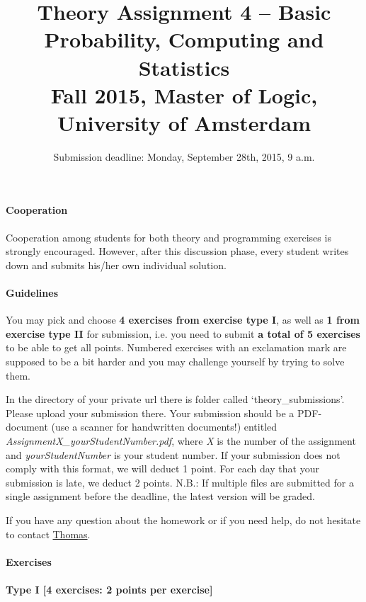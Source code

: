 \documentclass{article}
\title{Theory Assignment 4 -- Basic Probability, Computing and Statistics\\[2mm]
\large{Fall 2015, Master of Logic, University of Amsterdam}}
\author{}
\date{Submission deadline: Monday, September 28th, 2015, 9 a.m.}
\begin{document}
\maketitle

\paragraph{Cooperation}
Cooperation among students for both theory and programming exercises
is strongly encouraged.  However, after this discussion phase, every student writes down and submits his/her own individual solution.

\paragraph{Guidelines}
You may pick and choose {\bf 4 exercises from exercise type I}, as well as {\bf 1 from exercise type II} for submission, i.e. you need to submit {\bf a total of 5 exercises} to be able to get all points. Numbered exercises with an exclamation mark are supposed to be a bit harder and you may challenge yourself by trying to solve them.

In the directory of your private url there is folder called `theory\_submissions'. Please upload your submission there. Your submission should be a PDF-document (use a scanner for handwritten documents!) entitled \textit{AssignmentX\_yourStudentNumber.pdf}, where \textit{X} is the number of the assignment and \textit{yourStudentNumber} is your student number. If your submission does not comply with this format, we will deduct 1 point. For each day that your submission is late, we deduct 2 points. N.B.: If multiple files are submitted for a single assignment before the deadline, the latest version will be graded.

If you have any question about the homework or if you need help, do not hesitate to contact \href{mailto:T.S.Brochhagen@uva.nl}{Thomas}.

\paragraph{Exercises}

\paragraph{Type I [4 exercises: 2 points per exercise]}
\end{document}
